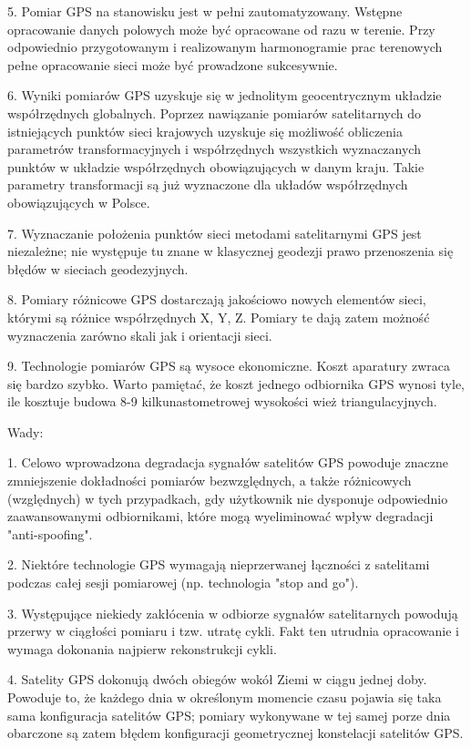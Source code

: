 5.  Pomiar GPS na stanowisku jest w pełni zautomatyzowany. Wstępne opracowanie danych polowych może być opracowane od razu w terenie. Przy odpowiednio przygotowanym i realizowanym harmonogramie prac terenowych pełne opracowanie sieci może być prowadzone sukcesywnie.\newline


6.  Wyniki pomiarów GPS uzyskuje się w jednolitym geocentrycznym układzie współrzędnych globalnych. Poprzez nawiązanie pomiarów satelitarnych do istniejących punktów sieci krajowych uzyskuje się możliwość obliczenia parametrów transformacyjnych i współrzędnych wszystkich wyznaczanych punktów w układzie współrzędnych obowiązujących w danym kraju. Takie parametry transformacji są już wyznaczone dla układów współrzędnych obowiązujących w Polsce.\newline


7.  Wyznaczanie położenia punktów sieci metodami satelitarnymi GPS jest niezależne; nie występuje tu znane w klasycznej geodezji prawo przenoszenia się błędów w sieciach geodezyjnych.\newline


8.  Pomiary różnicowe GPS dostarczają jakościowo nowych elementów sieci, którymi są różnice współrzędnych X, Y, Z. Pomiary te dają zatem możność wyznaczenia zarówno skali jak i orientacji sieci.\newline


9.  Technologie pomiarów GPS są wysoce ekonomiczne. Koszt aparatury zwraca się bardzo szybko. Warto pamiętać, że koszt jednego odbiornika GPS wynosi tyle, ile kosztuje budowa 8-9 kilkunastometrowej wysokości wież triangulacyjnych.\newline

Wady:\newline

1.  Celowo wprowadzona degradacja sygnałów satelitów GPS powoduje znaczne zmniejszenie dokładności pomiarów bezwzględnych, a także różnicowych (względnych) w tych przypadkach, gdy użytkownik nie dysponuje odpowiednio zaawansowanymi odbiornikami, które mogą wyeliminować wpływ degradacji "anti-spoofing".\newline


2.  Niektóre technologie GPS wymagają nieprzerwanej łączności z satelitami podczas całej sesji pomiarowej (np. technologia "stop and 
go").\newline


3.  Występujące niekiedy zakłócenia w odbiorze sygnałów satelitarnych powodują przerwy w ciągłości pomiaru i tzw. utratę cykli. Fakt ten utrudnia opracowanie i wymaga dokonania najpierw rekonstrukcji cykli.\newline


4.  Satelity GPS dokonują dwóch obiegów wokół Ziemi w ciągu jednej doby. Powoduje to, że każdego dnia w określonym momencie czasu pojawia się taka sama konfiguracja satelitów GPS; pomiary wykonywane w tej samej porze dnia obarczone są zatem błędem konfiguracji geometrycznej konstelacji satelitów GPS.\newline